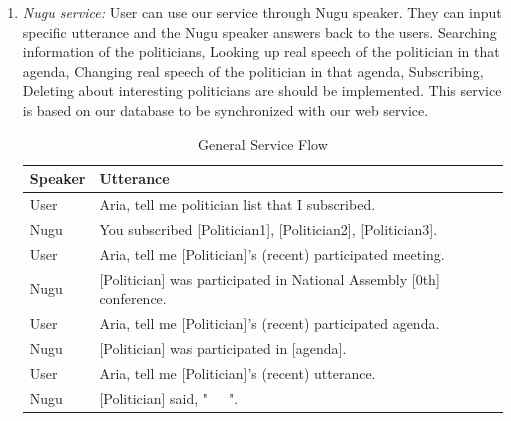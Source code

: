 \documentclass[conference]{IEEEtran}
\begin{document}
\begin{enumerate}
        \item \textit{Nugu service:} User can use our service through Nugu speaker. They can input specific utterance and the Nugu speaker answers back to the users. Searching information of the politicians, Looking up real speech of the politician in that agenda, Changing real speech of the politician in that agenda, Subscribing, Deleting about interesting politicians are should be implemented. This service is based on our database to be synchronized with our web service.
           

       
\begin{table}[htbp]
  \renewcommand{\arraystretch}{1.5}
\caption{General Service Flow}
\begin{center}
\begin{tabular}{|p{1cm}|p{8cm}|}
\hline
\textbf{Speaker} & \textbf{Utterance}\\
\hline
User & Aria, tell me politician list that I subscribed. \\
\hline
Nugu & You subscribed [Politician1], [Politician2], [Politician3]. \\
\hline
User & Aria, tell me [Politician]'s (recent) participated meeting.\\
\hline
Nugu & [Politician] was participated in National Assembly [0th] conference.\\
\hline
User & Aria, tell me [Politician]'s (recent) participated agenda. \\
\hline
Nugu & [Politician] was participated in [agenda].\\
\hline
User & Aria, tell me [Politician]'s (recent) utterance.\\
\hline
Nugu & [Politician] said, "~~~".\\
\hline
\end{tabular}
\label{tab2}
\end{center}
\end{table}
       

\end{enumerate}
\end{document}
